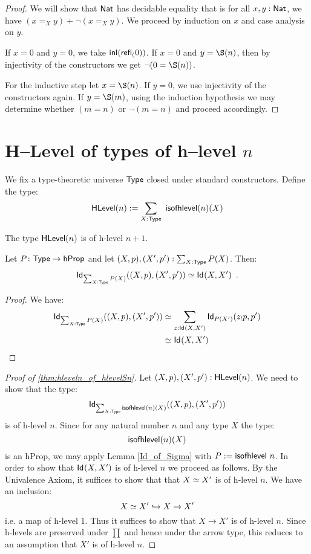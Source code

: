 \begin{proof}
 We will show that $\Nat$ has decidable equality that is for all $x, y : \Nat$, we have $(x =_X y) + \neg (x =_X y)$. 
 We proceed by induction on $x$ and case analysis on $y$.
 
 If $x = 0$ and $y = 0$, we take $\inl(\refl(0))$. If $x = 0$ and $y = \S(n)$, 
 then by injectivity of the constructors we get $\neg (0 = \S (n))$.
 
 For the inductive step let $x = \S (n)$. If $y = 0$, we use injectivity of the constructors again. 
 If $y = \S (m)$, using the induction hypothesis we may determine whether $(m = n)$ or $\neg(m = n)$ and proceed accordingly.
\end{proof}

\section{H--Level of types of h--level $n$}

We fix a type-theoretic universe $\Type$ closed under standard constructors. Define the type:
 \[\HLevel(n) := \sum_{X : \Type} \ \isofhlevel(n)(X) \]

\begin{thm}\label{thm:hleveln_of_hlevelSn}
 The type $\HLevel(n)$ is of h-level $n+1$.
\end{thm}

\begin{lem}\label{Id_of_Sigma}
 Let $P \colon \Type \to \hProp$ and let $(X, p), (X', p') : \sum_{X : \Type} P(X)$. Then:
 \[ \idtype[\sum_{X : \Type} P(X)]{(X, p)}{(X', p')} \simeq \idtype{X}{X'} \enspace .\]
\end{lem}

\begin{proof}
 We have:
 \begin{equation*}\begin{split}
  \idtype[\sum_{X : \Type} P(X)]{(X, p)}{(X', p')} & \simeq \sum_{z : \idtype{X}{X'}} \idtype[P(X')]{z_!p}{p'} \\
  & \simeq \idtype{X}{X'}
 \end{split}
 \end{equation*}
\end{proof}

\begin{proof}[Proof of \autoref{thm:hleveln_of_hlevelSn}]
 Let $(X, p), (X', p') : \HLevel(n)$. We need to show that the type:
 \[ \idtype[\sum_{X : \Type} \isofhlevel(n)(X)] {(X, p)}{(X', p')} \]
 is of h-level $n$. Since for any natural number $n$ and any type $X$ the type:
 \[\isofhlevel(n)(X) \]
 is an hProp, we may apply Lemma \ref{Id_of_Sigma} with $P := \isofhlevel \ n$. 
In order to show that $\idtype{X}{X'}$ is of h-level $n$ we proceed as follows. 
By the Univalence Axiom, it suffices to show that that $\eqv{X}{X'}$ is of h-level $n$. We have an inclusion:
 \[\eqv{X}{X'} \hookrightarrow X \rightarrow X'\]
 i.e. a map of h-level $1$. Thus it suffices to show that $X \rightarrow X'$ is of h-level $n$. 
Since h-levels are preserved under $\prod$ and hence under the arrow type, this reduces to an assumption that $X'$ is of h-level $n$.
\end{proof}


